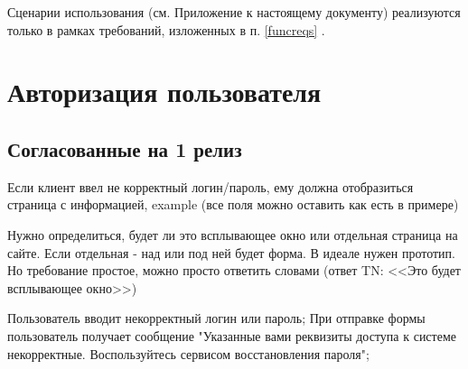 Сценарии использования (см. Приложение  к настоящему документу) реализуются только в рамках требований, изложенных в п. \ref{funcreqs} .

\section{Авторизация пользователя}
\ifcand
\subsection{Согласованные на 1 релиз}
\fi

{


\begin{wiki}
Если клиент ввел не корректный логин/пароль, ему должна отобразиться страница с информацией, example (все поля можно  оставить как есть в примере)
\end{wiki}

\begin{teamidea}
Нужно определиться, будет ли это всплывающее окно или отдельная страница на сайте. Если отдельная - над или под ней будет форма.  В идеале нужен прототип. Но требование простое, можно просто ответить словами (ответ TN: <<Это будет всплывающее окно>>)
\end{teamidea}




\begin{itogo}
Пользователь вводит некорректный логин или пароль; При отправке формы пользователь получает сообщение "Указанные вами реквизиты доступа к системе некорректные. Воспользуйтесь сервисом восстановления пароля";
\end{itogo}



}


